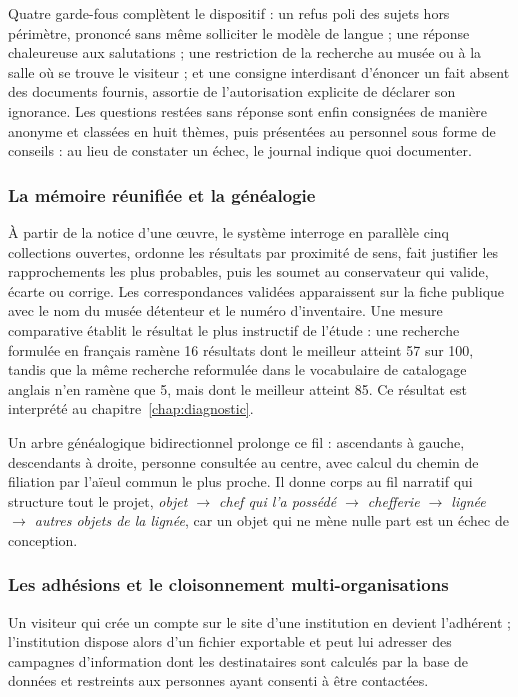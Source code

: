 Quatre garde-fous complètent le dispositif : un refus poli des sujets hors
périmètre, prononcé sans même solliciter le modèle de langue ; une réponse
chaleureuse aux salutations ; une restriction de la recherche au musée ou à la
salle où se trouve le visiteur ; et une consigne interdisant d'énoncer un fait
absent des documents fournis, assortie de l'autorisation explicite de déclarer
son ignorance. Les questions restées sans réponse sont enfin consignées de
manière anonyme et classées en huit thèmes, puis présentées au personnel sous
forme de conseils : au lieu de constater un échec, le journal indique quoi
documenter.

\subsubsection{La mémoire réunifiée et la généalogie}

À partir de la notice d'une œuvre, le système interroge en parallèle cinq
collections ouvertes, ordonne les résultats par proximité de sens, fait
justifier les rapprochements les plus probables, puis les soumet au conservateur
qui valide, écarte ou corrige. Les correspondances validées apparaissent sur la
fiche publique avec le nom du musée détenteur et le numéro d'inventaire. Une
mesure comparative établit le résultat le plus instructif de l'étude : une
recherche formulée en français ramène 16 résultats dont le meilleur atteint 57
sur 100, tandis que la même recherche reformulée dans le vocabulaire de
catalogage anglais n'en ramène que 5, mais dont le meilleur atteint 85. Ce
résultat est interprété au chapitre~\ref{chap:diagnostic}.

Un arbre généalogique bidirectionnel prolonge ce fil : ascendants à gauche,
descendants à droite, personne consultée au centre, avec calcul du chemin de
filiation par l'aïeul commun le plus proche. Il donne corps au fil narratif qui
structure tout le projet, \emph{objet $\rightarrow$ chef qui l'a possédé
$\rightarrow$ chefferie $\rightarrow$ lignée $\rightarrow$ autres objets de la
lignée}, car un objet qui ne mène nulle part est un échec de conception.

\subsubsection{Les adhésions et le cloisonnement multi-organisations}

Un visiteur qui crée un compte sur le site d'une institution en devient
l'adhérent ; l'institution dispose alors d'un fichier exportable et peut lui
adresser des campagnes d'information dont les destinataires sont calculés par la
base de données et restreints aux personnes ayant consenti à être contactées.

